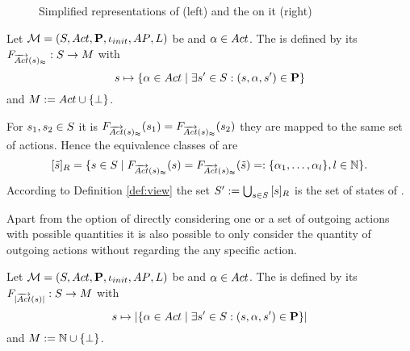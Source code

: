 \documentclass[preview]{standalone}
\begin{document}
\begin{figure}[h]
	\begin{minipage}{.5\textwidth}
		\hspace{5mm}
		
	\end{minipage}%
	\begin{minipage}{.5\textwidth}				
		\hspace{5mm}
		
	\end{minipage}	
	\caption{Simplified representations of \mdp (left) and the \viewN \viewweakoutactident on it (right)}	
	\label{fig:outActIdentWeakAfter}  	
\end{figure}


\begin{definition}
	Let ${{{\mathcal{M}}}} = {{({S}, {Act}, {\textbf{P}}, {\iota_{init}}, {AP}, {L})}}$ be \achgphN and ${\alpha} \in {Act}$. The \viewN \viewweakoutactident is defined by its \grpfctN ${{F_{{\overrightarrow{{Act}}}({s})_\approx}}} : {S} \to {\ensuremath{{M}}}$ with
	\[
	{s} \mapsto \{{\alpha} \in {Act} \mid \exists {s}' \in {S} : ({s}, {\alpha}, {s}') \in {\ensuremath{{\textbf{P}}}}\} 	
	\]
	and ${{M}} := {Act} \cup {\{\bot\}}$.
\end{definition}


For ${s}_1, {s}_2 \in {S}$ it is ${{F_{{\overrightarrow{{Act}}}({s})_\approx}}}({s}_1) = {{F_{{\overrightarrow{{Act}}}({s})_\approx}}}({s}_2)$ \iffN they are mapped to the same set of actions. Hence the equivalence classes of \eqrelview are
\[
	{{[{\tilde{{s}}}]_{{R}}}} = \{ {s} \in {S} \mid {\ensuremath{{F_{{\overrightarrow{{Act}}}({s})_\approx}}}}({s}) = {{F_{{\overrightarrow{{Act}}}({s})_\approx}}}({\tilde{{s}}}) =: \{{\alpha}_1, \dots, {\alpha}_l\}, l \in {\mathbb{N}}\}.
\]
According to Definition \ref{def:view} the set ${S}' := \bigcup_{{s} \in {S}} {{[{s}]_{{R}}}}$ is the set of states of \viewweakoutactident.

Apart from the option of directly considering one or a set of outgoing actions with possible quantities it is also possible to only consider the quantity of outgoing actions without regarding the any specific action.

\begin{definition}
	Let ${{{\mathcal{M}}}} = {{({S}, {Act}, {\textbf{P}}, {\iota_{init}}, {AP}, {L})}}$ be \achgphN and ${\alpha} \in {Act}$. The \viewN \viewoutactsetsize is defined by its \grpfctN ${{F_{{|{\overrightarrow{{Act}}}({s})|}}}} : {S} \to {\ensuremath{{M}}}$ with
	\[
	{s} \mapsto |\{{\alpha} \in {Act} \mid \exists {s}' \in {S} : ({s}, {\alpha}, {s}') \in {\ensuremath{{\textbf{P}}}}\}|
	\]
	and ${{M}} := {\mathbb{N}} \cup {\{\bot\}}$.
\end{definition}
\end{document}
